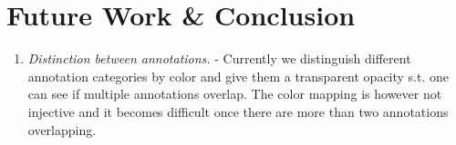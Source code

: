\section{Future Work \& Conclusion}

	\begin{enumerate}
		\item \emph{Distinction between annotations.} - Currently we distinguish different annotation categories by color and give them a transparent opacity s.t. one can see if multiple annotations overlap. The color mapping is however not injective and it becomes difficult once there are more than two annotations overlapping.
	\end{enumerate}
	
